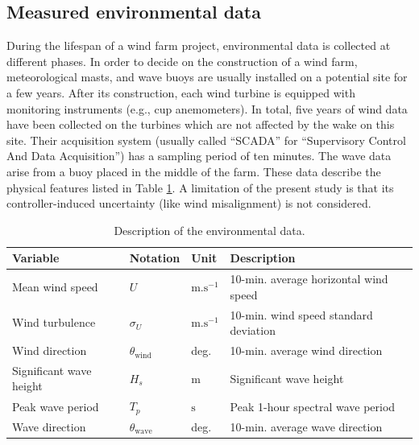 \subsection{Measured environmental data}
During the lifespan of a wind farm project, environmental data is collected at different phases. 
In order to decide on the construction of a wind farm, meteorological masts, and wave buoys are usually installed on a potential site for a few years. 
After its construction, each wind turbine is equipped with monitoring instruments (e.g., cup anemometers). 
In total, five years of wind data have been collected on the turbines which are not affected by the wake on this site. 
Their acquisition system (usually called ``SCADA'' for ``Supervisory Control And Data Acquisition'') has a sampling period of ten minutes. 
The wave data arise from a buoy placed in the middle of the farm. 
These data describe the physical features listed in Table \ref{tab:envi_variables_c4}. 
A limitation of the present study is that its controller-induced uncertainty (like wind misalignment) is not considered. 

\begin{table} 
    \begin{center}
    \begin{tabularx}{\textwidth}{@{\extracolsep\fill}llll@{}}
    \hline
    Variable & Notation & Unit & Description\\
    \hline
    Mean wind speed & $U$ & $\mathrm{m.s^{-1}}$ & 10-min. average horizontal wind speed\\
    Wind turbulence & $\sigma_U $ & $\mathrm{m.s^{-1}}$ & 10-min. wind speed standard deviation\\
    Wind direction\footnotemark & $\theta_{\mathrm{wind}} $ & deg. &  10-min. average wind direction\\
    Significant wave height & $H_s $ & m & Significant wave height\\
    Peak wave period & $T_p $  & $\mathrm{s}$ & Peak 1-hour spectral wave period \\
    Wave direction & $\theta_{\mathrm{wave}} $ & deg. &  10-min. average wave direction\\
    \hline
    \end{tabularx}
    \caption{Description of the environmental data.}
    \label{tab:envi_variables_c4}
    \end{center}
\end{table}

